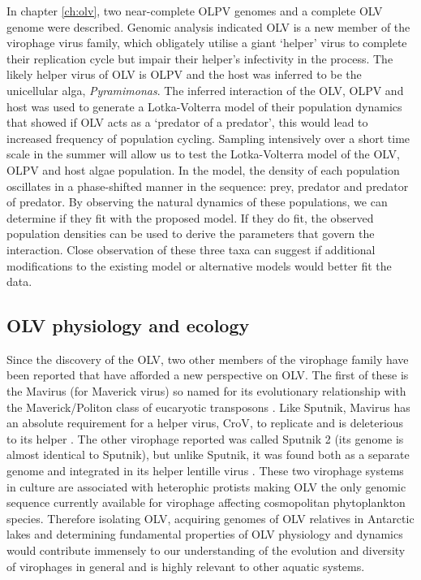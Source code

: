 In chapter \ref{ch:olv}, two near-complete \ac{OLPV} genomes and a complete \ac{OLV} genome were described.
Genomic analysis indicated \ac{OLV} is a new member of the virophage virus family, which obligately utilise a  giant `helper' virus to complete their replication cycle but impair their helper's infectivity in the process.
The likely helper virus of \ac{OLV} is \ac{OLPV} and the host was inferred to be the unicellular alga, \emph{Pyramimonas}.
The inferred interaction of the \ac{OLV}, \ac{OLPV} and host was used to generate a Lotka-Volterra model of their population dynamics that showed if \ac{OLV} acts as a `predator of a predator', this would lead to increased frequency of population cycling.
Sampling intensively over a short time scale in the summer will allow us to test the Lotka-Volterra model of the \ac{OLV}, \ac{OLPV} and host algae population.
In the model, the density of each population oscillates in a phase-shifted manner in the sequence: prey, predator and predator of predator.
By observing the natural dynamics of these populations, we can determine if they fit with the proposed model.
If they do fit, the observed population densities can be used to derive the parameters that govern the interaction.
Close observation of these three taxa can suggest if additional modifications to the existing model or alternative models would better fit the data.

\subsection{\acs{OLV} physiology and ecology}
Since the discovery of the \ac{OLV}, two other members of the virophage family have been reported that have afforded a new perspective on \ac{OLV}.
The first of these is the Mavirus (for Maverick virus) so named for its evolutionary relationship with the Maverick/Politon class of eucaryotic transposons \cite{Fischer2011a}.
Like Sputnik, Mavirus has an absolute requirement for a helper virus, \ac{CroV}, to replicate and is deleterious to its helper \cite{Fischer2011a}.
The other virophage reported was called Sputnik 2 (its genome is almost identical to Sputnik), but unlike Sputnik, it was found both as a separate genome and integrated in its helper lentille virus \cite{Desnues2012}.
These two virophage systems in culture are associated with heterophic protists making \ac{OLV} the only genomic sequence currently available for virophage affecting cosmopolitan phytoplankton species.
Therefore isolating \ac{OLV}, acquiring genomes of \ac{OLV} relatives in Antarctic lakes and determining fundamental properties of \ac{OLV} physiology and dynamics would contribute immensely to our understanding of the evolution and diversity of virophages in general and is highly relevant to other aquatic systems.

